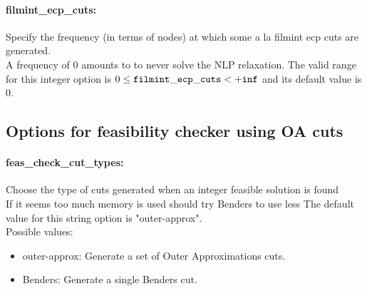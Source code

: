 \paragraph{\bf filmint\_ecp\_cuts:}\label{sec:filmint_ecp_cuts} Specify the frequency (in terms of nodes) at which some a la filmint ecp cuts are generated. $\;$ \\
 A frequency of 0 amounts to to never solve the
NLP relaxation. The valid range for this integer option is
$0 \le {\tt filmint\_ecp\_cuts } <  {\tt +inf}$
and its default value is $0$.


\subsection{Options for feasibility checker using OA cuts}
\label{sec:Options_for_feasibility_checker_using_OA_cuts}
\paragraph{\bf feas\_check\_cut\_types:}\label{sec:feas_check_cut_types} Choose the type of cuts generated when an integer feasible solution is found $\;$ \\
 If it seems too much memory is used should try
Benders to use less
The default value for this string option is "outer-approx".
\\ 
Possible values:
\begin{itemize}
   \item outer-approx: Generate a set of Outer Approximations cuts.
   \item Benders: Generate a single Benders cut.
\end{itemize}

